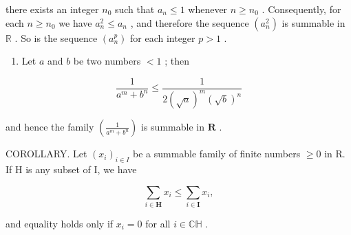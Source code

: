 there exists an integer \(n_0\) such that \(a_n \leqslant 1\) whenever \(n \geqslant n_0\) . Consequently, for each \(n \geqslant n_0\) we have \(a_n^2 \leqslant a_n\) , and therefore the sequence \((a_n^2)\) is summable in \(\mathbb{R}\) . So is the sequence \((a_n^p)\) for each integer \(p > 1\) .

\begin{enumerate}
\def\labelenumi{\arabic{enumi})}
\setcounter{enumi}{2}
\tightlist
\item
  Let \(a\) and \(b\) be two numbers \(< 1\) ; then
\end{enumerate}

\[
\frac {1}{a ^ {m} + b ^ {n}} \leqslant \frac {1}{2 (\sqrt {a}) ^ {m} (\sqrt {b}) ^ {n}}
\]

and hence the family \(\left(\frac{1}{a^m + b^n}\right)\) is summable in \(\mathbf{R}\) .

COROLLARY. Let \((x_{i})_{i\in I}\) be a summable family of finite numbers \(\geqslant 0\) in R. If H is any subset of I, we have

\[
\sum_ {i \in \mathbf {H}} x _ {i} \leqslant \sum_ {i \in \mathbf {I}} x _ {i},
\]

and equality holds only if \(x_{i} = 0\) for all \(i \in \mathbb{C}\mathbb{H}\) .

